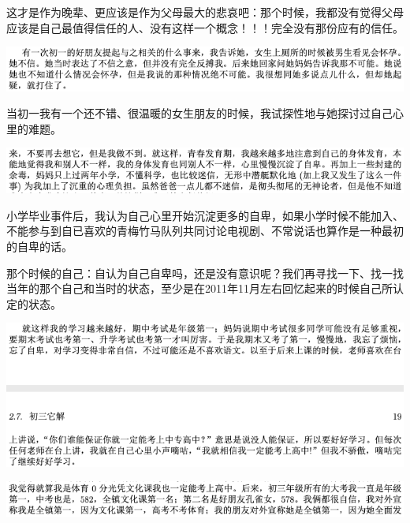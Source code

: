 \documentclass[9pt, b5paper]{article}
\begin{document}
这才是作为晚辈、更应该是作为父母最大的悲哀吧：那个时候，我都没有觉得父母应该是自己最值得信任的人、没有这样一个概念！！！完全没有那份应有的信任。

\begin{center}
\includegraphics[width=.9\linewidth]{./pic/backups_plans_20210422_094753.png}
\end{center}

当初一我有一个还不错、很温暖的女生朋友的时候，我试探性地与她探讨过自己心里的难题。

\begin{center}
\includegraphics[width=.9\linewidth]{./pic/backups_plans_20210422_101717.png}
\end{center}

小学毕业事件后，我认为自己心里开始沉淀更多的自卑，如果小学时候不能加入、不能参与到自已喜欢的青梅竹马队列共同讨论电视剧、不常说话也算作是一种最初的自卑的话。

那个时候的自己：自认为自己自卑吗，还是没有意识呢？我们再寻找一下、找一找当年的那个自己和当时的状态，至少是在2011年11月左右回忆起来的时候自己所认定的状态。

\begin{center}
\includegraphics[width=.9\linewidth]{./pic/backups_plans_20210422_101921.png}
\end{center}

\begin{center}
\includegraphics[width=.9\linewidth]{./pic/backups_plans_20210422_102045.png}
\end{center}
\end{document}
